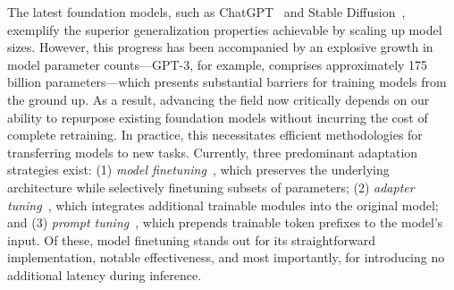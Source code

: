 The latest foundation models, such as ChatGPT~\cite{brown2020language,chen2021evaluating} and Stable Diffusion~\cite{rombach2022high}, exemplify the superior generalization properties achievable by scaling up model sizes. However, this progress has been accompanied by an explosive growth in model parameter counts—GPT-3, for example, comprises approximately 175 billion parameters—which presents substantial barriers for training models from the ground up. As a result, advancing the field now critically depends on our ability to repurpose existing foundation models without incurring the cost of complete retraining. In practice, this necessitates efficient methodologies for transferring models to new tasks. Currently, three predominant adaptation strategies exist: (1) \emph{model finetuning}~\cite{hulora2022,zaken2022bitfit,guo2020parameter,raffel2020exploring,qiu2023controlling,zhang2022adaptive,chavan2023one}, which preserves the underlying architecture while selectively finetuning subsets of parameters; (2) \emph{adapter tuning}~\cite{rebuffi2017learning,houlsby2019parameter,pfeiffer2020adapterfusion,lin2020exploring,he2021towards}, which integrates additional trainable modules into the original model; and (3) \emph{prompt tuning}~\cite{li2021prefix,lester2021power}, which prepends trainable token prefixes to the model's input. Of these, model finetuning stands out for its straightforward implementation, notable effectiveness, and most importantly, for introducing no additional latency during inference.

